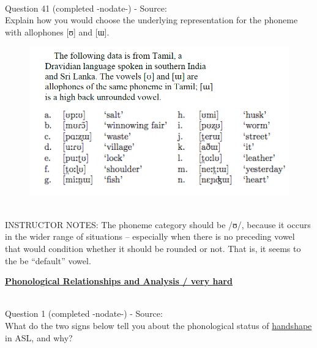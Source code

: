 \documentclass[12pt]{article}
\begin{document}
~\\

{\large Question 41} (completed -nodate-) - Source: \\

Explain how you would choose the underlying representation for the phoneme with allophones [ʊ] and [ɯ].\\

\begin{figure}[H]
\includegraphics{../images/tamil.png}
\end{figure}

~\\
INSTRUCTOR NOTES: The phoneme category should be /ʊ/, because it occurs in the wider range of situations – especially when there is no preceding vowel that would condition whether it should be rounded or not. That is, it seems to the be “default” vowel.


\newpage\textbf{\underline{\huge Phonological Relationships and Analysis / very hard\\}}

~\\

{\large Question 1} (completed -nodate-) - Source: \\

What do the two signs below tell you about the phonological status of \underline{handshape} in ASL, and why?\\
\end{document}
